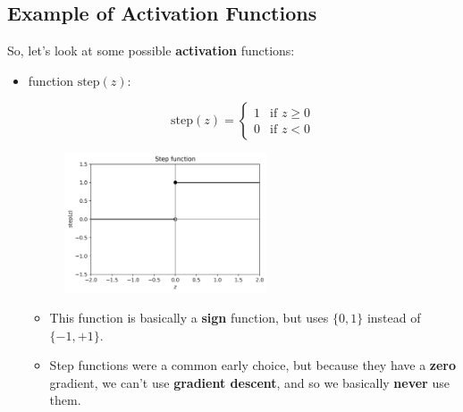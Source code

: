 
    \subsection*{Example of Activation Functions}
    
        So, let's look at some possible \textbf{activation} functions:
        
        \begin{itemize}
            \item {} function $\text{step}(z)$:
            
                \begin{equation}
                    \text{step}(z) 
                    =
                    \begin{cases}
                      1 & \text{if $z \geq 0$}\\
                      0 & \text{if $z < 0$}
                    \end{cases}
                \end{equation}
                
                \begin{figure}[H]
                    \centering
                    \includegraphics[width=60mm,scale=0.4]{images/nn_images/step_fn.png}
                \end{figure}
                
                \begin{itemize}
                    \item This function is basically a \textbf{sign} function, but uses $\{0, 1\}$ instead of $\{-1, +1\}$.
                    
                    \item Step functions were a common early choice, but because they have a \textbf{zero} gradient, we can't use \textbf{gradient descent}, and so we basically \textbf{never} use them.
                \end{itemize}
            

\end{itemize}
